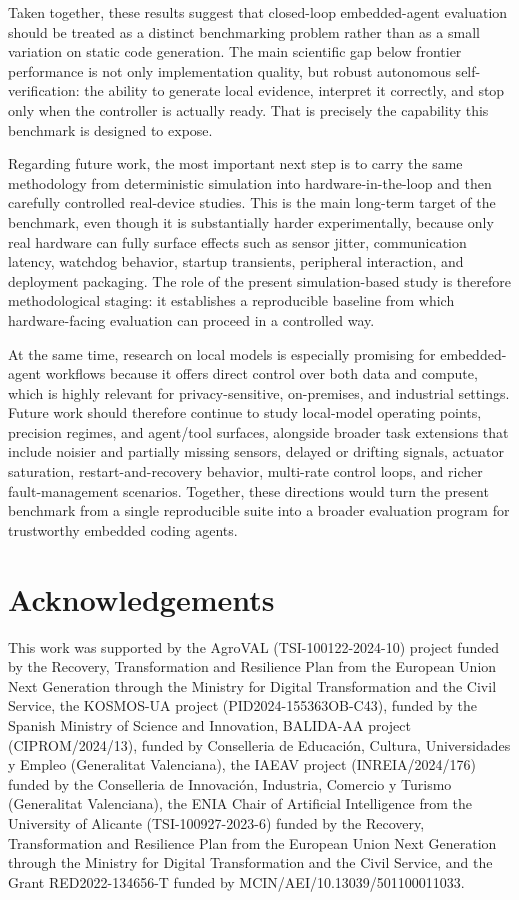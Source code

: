 \documentclass[a4paper,fleqn]{cas-dc}
\begin{document}
Taken together, these results suggest that closed-loop embedded-agent evaluation should be treated as a distinct benchmarking problem rather than as a small variation on static code generation. The main scientific gap below frontier performance is not only implementation quality, but robust autonomous self-verification: the ability to generate local evidence, interpret it correctly, and stop only when the controller is actually ready. That is precisely the capability this benchmark is designed to expose.


Regarding future work, the most important next step is to carry the same methodology from deterministic simulation into hardware-in-the-loop and then carefully controlled real-device studies. This is the main long-term target of the benchmark, even though it is substantially harder experimentally, because only real hardware can fully surface effects such as sensor jitter, communication latency, watchdog behavior, startup transients, peripheral interaction, and deployment packaging. The role of the present simulation-based study is therefore methodological staging: it establishes a reproducible baseline from which hardware-facing evaluation can proceed in a controlled way.

At the same time, research on local models is especially promising for embedded-agent workflows because it offers direct control over both data and compute, which is highly relevant for privacy-sensitive, on-premises, and industrial settings. Future work should therefore continue to study local-model operating points, precision regimes, and agent/tool surfaces, alongside broader task extensions that include noisier and partially missing sensors, delayed or drifting signals, actuator saturation, restart-and-recovery behavior, multi-rate control loops, and richer fault-management scenarios. Together, these directions would turn the present benchmark from a single reproducible suite into a broader evaluation program for trustworthy embedded coding agents.

\section*{Acknowledgements}

This work was supported by the AgroVAL (TSI-100122-2024-10) project funded by the Recovery, Transformation and Resilience Plan from the European Union Next Generation through the Ministry for Digital Transformation and the Civil Service, the KOSMOS-UA project (PID2024-155363OB-C43), funded by the Spanish Ministry of Science and Innovation, BALIDA-AA project (CIPROM/2024/13), funded by Conselleria de Educación, Cultura, Universidades y Empleo (Generalitat Valenciana), the IAEAV project (INREIA/2024/176) funded by the Conselleria de Innovación, Industria, Comercio y Turismo (Generalitat Valenciana), the ENIA Chair of Artificial Intelligence from the University of Alicante (TSI-100927-2023-6) funded by the Recovery, Transformation and Resilience Plan from the European Union Next Generation through the Ministry for Digital Transformation and the Civil Service, and the Grant RED2022-134656-T funded by MCIN/AEI/10.13039/501100011033.
\end{document}
